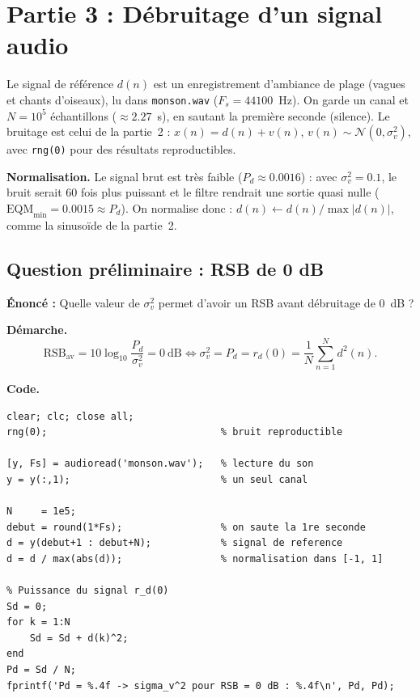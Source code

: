 \section{Partie 3 : Débruitage d'un signal audio}

Le signal de référence $d(n)$ est un enregistrement d'ambiance de plage (vagues et chants d'oiseaux), lu dans \texttt{monson.wav} ($F_s=44100$~Hz). On garde un canal et $N=10^5$ échantillons ($\approx 2.27$~s), en sautant la première seconde (silence). Le bruitage est celui de la partie~2 : $x(n)=d(n)+v(n)$, $v(n)\sim\mathcal{N}(0,\sigma_v^2)$, avec \texttt{rng(0)} pour des résultats reproductibles.

\textbf{Normalisation.} Le signal brut est très faible ($P_d\approx 0.0016$) : avec $\sigma_v^2=0.1$, le bruit serait 60 fois plus puissant et le filtre rendrait une sortie quasi nulle ($\mathrm{EQM}_{\min}=0.0015\approx P_d$). On normalise donc : $d(n)\leftarrow d(n)/\max|d(n)|$, comme la sinusoïde de la partie~2.

\subsection{Question préliminaire : RSB de 0 dB}

\begin{enonce}
\textbf{Énoncé :} Quelle valeur de $\sigma_v^2$ permet d'avoir un RSB avant débruitage de 0~dB ?
\end{enonce}

\textbf{Démarche.}
\[
\mathrm{RSB}_{\mathrm{av}}=10\log_{10}\frac{P_d}{\sigma_v^2}=0~\text{dB}
\iff \sigma_v^2=P_d=r_d(0)=\frac{1}{N}\sum_{n=1}^{N}d^2(n).
\]

\textbf{Code.}
\begin{lstlisting}
clear; clc; close all;
rng(0);                              % bruit reproductible

[y, Fs] = audioread('monson.wav');   % lecture du son
y = y(:,1);                          % un seul canal

N     = 1e5;
debut = round(1*Fs);                 % on saute la 1re seconde
d = y(debut+1 : debut+N);            % signal de reference
d = d / max(abs(d));                 % normalisation dans [-1, 1]

% Puissance du signal r_d(0)
Sd = 0;
for k = 1:N
    Sd = Sd + d(k)^2;
end
Pd = Sd / N;
fprintf('Pd = %.4f -> sigma_v^2 pour RSB = 0 dB : %.4f\n', Pd, Pd);
\end{lstlisting}

